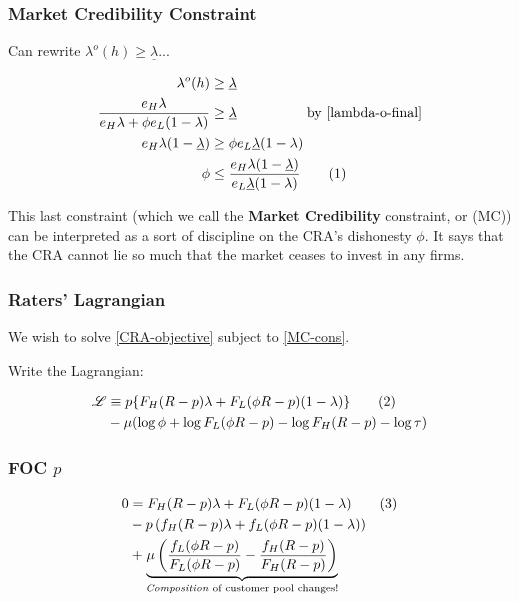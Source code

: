 \documentclass{beamer}
\newcommand\numberthis{\addtocounter{equation}{1}\tag{\theequation}}
\begin{document}
\begin{frame}
    \frametitle{Market Credibility Constraint}

Can rewrite $\lambda^o(h) \geq \underline{\lambda}$...

\begin{align*}
    \lambda^o(h) &\geq \underline{\lambda} \\ 
    \frac{e_H \lambda}{e_H \lambda + \phi e_L (1 - \lambda)} &\geq \underline{\lambda} \hspace{5 em} \text{by \eqref{lambda-o-final}} \\ 
    e_H \lambda (1 - \underline{\lambda}) &\geq \phi e_L \underline{\lambda} (1 - \lambda) \\ 
    \phi &\leq \frac{e_H \lambda (1 - \underline{\lambda})}{e_L \underline{\lambda} (1 - \lambda)} \label{MC-cons}\numberthis
\end{align*} \pause 

This last constraint (which we call the \textbf{Market Credibility} constraint, or (MC)) can be interpreted as a sort of discipline on the CRA's dishonesty $\phi$. It says that the CRA cannot lie so much that the market ceases to invest in any firms. 
\end{frame}

\begin{frame}
    \frametitle{Raters' Lagrangian}
We wish to solve \eqref{CRA-objective} subject to \eqref{MC-cons}.

Write the Lagrangian: 

\begin{align*}
    \mathscr{L} &\equiv p \{ F_H (R - p)\lambda + F_L(\phi R - p)(1 - \lambda)\} \label{Lagrangian} \numberthis \\ 
    &- \mu(\log \phi + \log F_L(\phi R - p) - \log F_H(R - p) - \log \tau)
\end{align*}
\end{frame}

\begin{frame}
    \frametitle{FOC $p$}

    \begin{align*}
        0 &= F_H (R - p)\lambda + F_L(\phi R - p)(1 - \lambda) \numberthis \label{FOC-p}  \\ 
        &- p\left(f_H(R - p)\lambda + f_L(\phi R - p)(1 - \lambda)\right)   \\ 
        &+ \underbrace{\mu \left(\frac{f_L (\phi R - p)}{F_L (\phi R - p)} - \frac{f_H(R - p)}{F_H(R - p)}\right)}_{\text{\emph{Composition} of customer pool changes!}}
    \end{align*}
\end{frame}
\end{document}
